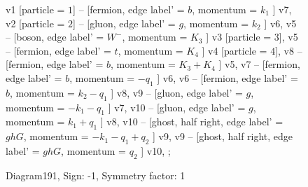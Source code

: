 \documentclass{revtex4}
\begin{document}
\begin{figure}[!htb]
\begin{center}
{    %
v1 [particle = \(1\)] -- [fermion, edge label' = \(b\), momentum = \(k_{1}\) ] v7, 
v2 [particle = \(2\)] -- [gluon, edge label' = \(g\), momentum = \(k_{2}\) ] v6, 
v5 -- [boson, edge label' = \(W^{-}\), momentum = \(K_{3}\) ] v3 [particle = \(3\)], 
v5 -- [fermion, edge label' = \(t\), momentum = \(K_{4}\) ] v4 [particle = \(4\)], 
v8 -- [fermion, edge label' = \(b\), momentum = \(K_{3} + K_{4}\) ] v5, 
v7 -- [fermion, edge label' = \(b\), momentum = \(-q_{1}\) ] v6, 
v6 -- [fermion, edge label' = \(b\), momentum = \(k_{2} - q_{1}\) ] v8, 
v9 -- [gluon, edge label' = \(g\), momentum = \(-k_{1} - q_{1}\) ] v7, 
v10 -- [gluon, edge label' = \(g\), momentum = \(k_{1} + q_{1}\) ] v8, 
v10 -- [ghost, half right, edge label' = \(ghG\), momentum = \(-k_{1} - q_{1} + q_{2}\) ] v9, 
v9 -- [ghost, half right, edge label' = \(ghG\), momentum = \(q_{2}\) ] v10, 
};
\end{center}
\caption{Diagram191, Sign: -1, Symmetry factor: 1}
\end{figure}
\newpage
\end{document}
